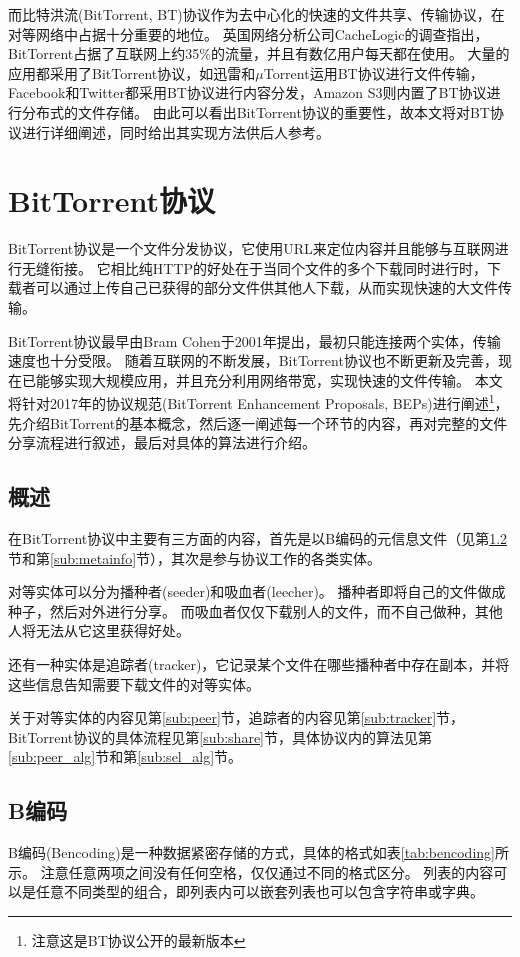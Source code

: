 \documentclass[thesis]{thesis}
\begin{document}
而比特洪流(BitTorrent, BT)协议\cite{wiki_bt}作为去中心化的快速的文件共享、传输协议，在对等网络中占据十分重要的地位。
英国网络分析公司CacheLogic的调查指出，BitTorrent占据了互联网上约35\%的流量，并且有数亿用户每天都在使用\cite{internet_traffic}。
大量的应用都采用了BitTorrent协议，如迅雷\cite{xunlei}和$\mu$Torrent\cite{utorrent}运用BT协议进行文件传输，Facebook\cite{facebook}和Twitter\cite{twitter}都采用BT协议进行内容分发，Amazon S3则内置了BT协议进行分布式的文件存储。
由此可以看出BitTorrent协议的重要性，故本文将对BT协议进行详细阐述，同时给出其实现方法供后人参考。

\section{BitTorrent协议}
BitTorrent协议是一个文件分发协议，它使用URL来定位内容并且能够与互联网进行无缝衔接。
它相比纯HTTP的好处在于当同个文件的多个下载同时进行时，下载者可以通过上传自己已获得的部分文件供其他人下载，从而实现快速的大文件传输。

BitTorrent协议最早由Bram Cohen于2001年提出，最初只能连接两个实体，传输速度也十分受限\cite{bt_ppt}。
随着互联网的不断发展，BitTorrent协议也不断更新及完善，现在已能够实现大规模应用，并且充分利用网络带宽，实现快速的文件传输。
本文将针对2017年的协议规范(BitTorrent Enhancement Proposals, BEPs)\cite{bt_org}进行阐述\footnote{注意这是BT协议公开的最新版本}，先介绍BitTorrent的基本概念，然后逐一阐述每一个环节的内容，再对完整的文件分享流程进行叙述，最后对具体的算法进行介绍。

\subsection{概述}
在BitTorrent协议中主要有三方面的内容，首先是以B编码的元信息文件（见第\ref{sub:bencoding}节和第\ref{sub:metainfo}节），其次是参与协议工作的各类实体。

对等实体可以分为播种者(seeder)和吸血者(leecher)。
播种者即将自己的文件做成种子，然后对外进行分享。
而吸血者仅仅下载别人的文件，而不自己做种，其他人将无法从它这里获得好处。

还有一种实体是追踪者(tracker)，它记录某个文件在哪些播种者中存在副本，并将这些信息告知需要下载文件的对等实体。

关于对等实体的内容见第\ref{sub:peer}节，追踪者的内容见第\ref{sub:tracker}节，BitTorrent协议的具体流程见第\ref{sub:share}节，具体协议内的算法见第\ref{sub:peer_alg}节和第\ref{sub:sel_alg}节。

\subsection{B编码}
\label{sub:bencoding}
B编码(Bencoding)是一种数据紧密存储的方式，具体的格式如表\ref{tab:bencoding}所示。
注意任意两项之间没有任何空格，仅仅通过不同的格式区分。
列表的内容可以是任意不同类型的组合，即列表内可以嵌套列表也可以包含字符串或字典。
\end{document}
